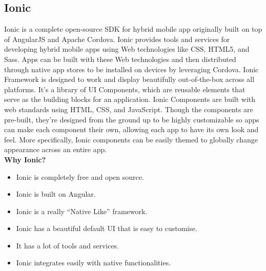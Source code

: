 \subsection{Ionic}
Ionic is a complete open-source SDK for hybrid mobile app originally built on top of AngularJS and Apache Cordova.
Ionic provides tools and services for developing hybrid mobile apps using Web technologies like CSS, HTML5, and Sass. Apps can be built with these Web technologies and then distributed through native app stores to be installed on devices by leveraging Cordova.
Ionic Framework is designed to work and display beautifully out-of-the-box across all platforms. It's a library of UI Components, which are reusable elements that serve as the building blocks for an application. Ionic Components are built with web standards using HTML, CSS, and JavaScript. Though the components are pre-built, they’re designed from the ground up to be highly customizable so apps can make each component their own, allowing each app to have its own look and feel. More specifically, Ionic components can be easily themed to globally change appearance across an entire app.\\

\textbf{Why Ionic?}
\begin{itemize}
\item Ionic is completely free and open source.
\item Ionic is built on Angular.
\item Ionic is a really “Native Like” framework.
\item Ionic has a beautiful default UI that is easy to customise.
\item It has a lot of tools and services.
\item Ionic integrates easily with native functionalities.
\end{itemize}
